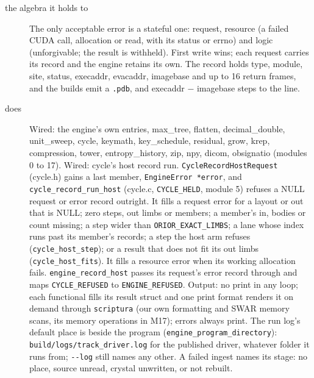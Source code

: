 \begin{description}
\item[{the algebra it holds to}] The only acceptable error is a stateful one: request, resource (a failed CUDA call, allocation or read, with its status or errno) and logic (unforgivable; the result is withheld). First write wins; each request carries its record and the engine retains its own. The record holds type, module, site, status, execaddr, evacaddr, imagebase and up to 16 return frames, and the builds emit a \texttt{.\allowbreak{}pdb}, and execaddr − imagebase steps to the line.
\item[{does}] Wired: the engine's own entries, max\_\allowbreak{}tree, flatten, decimal\_\allowbreak{}double, unit\_\allowbreak{}sweep, cycle, keymath, key\_\allowbreak{}schedule, residual, grow, krep, compression, tower, entropy\_\allowbreak{}history, zip, npy, dicom, obsignatio (modules 0 to 17). Wired: cycle's host record run. \texttt{Cycle\allowbreak{}Record\allowbreak{}Host\allowbreak{}Request} (cycle.h) gains a last member, \texttt{Engine\allowbreak{}Error *error}, and \texttt{cycle\_\allowbreak{}record\_\allowbreak{}run\_\allowbreak{}host} (cycle.c, \texttt{CYCLE\_\allowbreak{}HELD}, module 5) refuses a NULL request or error record outright. It fills a request error for a layout or out that is NULL; zero steps, out limbs or members; a member's in, bodies or count missing; a step wider than \texttt{ORIOR\_\allowbreak{}EXACT\_\allowbreak{}LIMBS}; a lane whose index runs past its member's records; a step the host arm refuses (\texttt{cycle\_\allowbreak{}host\_\allowbreak{}step}); or a result that does not fit its out limbs (\texttt{cycle\_\allowbreak{}host\_\allowbreak{}fits}). It fills a resource error when its working allocation fails. \texttt{engine\_\allowbreak{}record\_\allowbreak{}host} passes its request's error record through and maps \texttt{CYCLE\_\allowbreak{}REFUSED} to \texttt{ENGINE\_\allowbreak{}REFUSED}. Output: no print in any loop; each functional fills its result struct and one print format renders it on demand through \texttt{scriptura} (our own formatting and SWAR memory scans, its memory operations in M17); errors always print. The run log's default place is beside the program (\texttt{engine\_\allowbreak{}program\_\allowbreak{}directory}): \texttt{build/\allowbreak{}logs/\allowbreak{}track\_\allowbreak{}driver.\allowbreak{}log} for the published driver, whatever folder it runs from; \texttt{-\allowbreak{}-\allowbreak{}log} still names any other. A failed ingest names its stage: no place, source unread, crystal unwritten, or not rebuilt.

\end{description}
